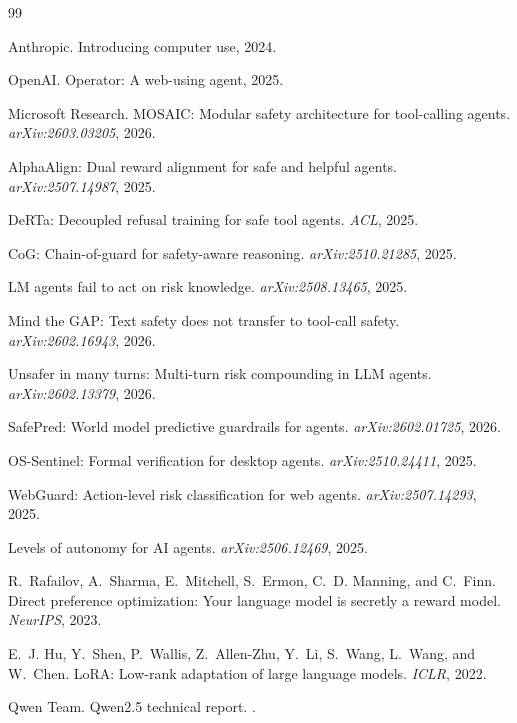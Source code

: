 \documentclass{article}
\begin{document}



\begin{thebibliography}{99}

Anthropic.
\newblock Introducing computer use, 2024.

OpenAI.
\newblock Operator: A web-using agent, 2025.

Microsoft Research.
\newblock MOSAIC: Modular safety architecture for tool-calling agents.
\newblock \emph{arXiv:2603.03205}, 2026.

AlphaAlign: Dual reward alignment for safe and helpful agents.
\newblock \emph{arXiv:2507.14987}, 2025.

DeRTa: Decoupled refusal training for safe tool agents.
\newblock \emph{ACL}, 2025.

CoG: Chain-of-guard for safety-aware reasoning.
\newblock \emph{arXiv:2510.21285}, 2025.

LM agents fail to act on risk knowledge.
\newblock \emph{arXiv:2508.13465}, 2025.

Mind the GAP: Text safety does not transfer to tool-call safety.
\newblock \emph{arXiv:2602.16943}, 2026.

Unsafer in many turns: Multi-turn risk compounding in LLM agents.
\newblock \emph{arXiv:2602.13379}, 2026.

SafePred: World model predictive guardrails for agents.
\newblock \emph{arXiv:2602.01725}, 2026.

OS-Sentinel: Formal verification for desktop agents.
\newblock \emph{arXiv:2510.24411}, 2025.

WebGuard: Action-level risk classification for web agents.
\newblock \emph{arXiv:2507.14293}, 2025.

Levels of autonomy for AI agents.
\newblock \emph{arXiv:2506.12469}, 2025.

R.~Rafailov, A.~Sharma, E.~Mitchell, S.~Ermon, C.~D. Manning, and C.~Finn.
\newblock Direct preference optimization: Your language model is secretly a reward model.
\newblock \emph{NeurIPS}, 2023.

E.~J. Hu, Y.~Shen, P.~Wallis, Z.~Allen-Zhu, Y.~Li, S.~Wang, L.~Wang, and W.~Chen.
\newblock LoRA: Low-rank adaptation of large language models.
\newblock \emph{ICLR}, 2022.

Qwen Team.
\newblock Qwen2.5 technical report.
.

\end{thebibliography}
\end{document}
